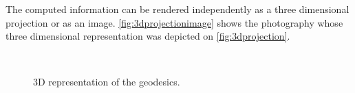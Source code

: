 The computed information can be rendered independently as a three dimensional projection or as an image. \autoref{fig:3dprojectionimage} shows the photography whose three dimensional representation was depicted on \autoref{fig:3dprojection}.

\begin{figure}[bth]
	\myfloatalign
	 \quad
	 \\
	 \quad
	\caption[3D representation of the geodesics]{3D representation of the geodesics.}\label{fig:3dprojection}
\end{figure}

